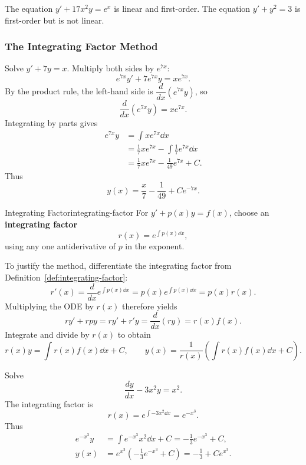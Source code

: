 \begin{example}
  The equation $y'+17x^2y=e^x$ is linear and first-order.
  The equation $y'+y^2=3$ is first-order but is not linear.
\end{example}

\subsubsection{The Integrating Factor Method}

\begin{example}
  Solve $y'+7y=x$. Multiply both sides by $e^{7x}$:
  \[
    e^{7x}y'+7e^{7x}y=xe^{7x}.
  \]
  By the product rule, the left-hand side is $\dfrac{d}{dx}(e^{7x}y)$, so
  \[
    \frac{d}{dx}(e^{7x}y)=xe^{7x}.
  \]
  Integrating by parts gives
  \begin{align*}
    e^{7x}y & = \int xe^{7x}\dd{x}                       \\
            & = \frac17 xe^{7x}-\int\frac17 e^{7x}\dd{x} \\
            & = \frac17 xe^{7x}-\frac1{49}e^{7x}+C.
  \end{align*}
  Thus
  \[
    y(x)=\frac{x}{7}-\frac1{49}+Ce^{-7x}.
  \]
\end{example}

\begin{definition}{Integrating Factor}{integrating-factor}
  For $y'+p(x)y=f(x)$, choose an \textbf{integrating factor}
  \[
    r(x)=e^{\int p(x)\dd{x}},
  \]
  using any one antiderivative of $p$ in the exponent.
\end{definition}

To justify the method, differentiate the integrating factor from Definition~\ref{def:integrating-factor}:
\[
  r'(x)=\frac{d}{dx}e^{\int p(x)\dd{x}}
  =p(x)e^{\int p(x)\dd{x}}=p(x)r(x).
\]
Multiplying the ODE by $r(x)$ therefore yields
\[
  ry'+rpy=ry'+r'y=\frac{d}{dx}(ry)=r(x)f(x).
\]
Integrate and divide by $r(x)$ to obtain
\[
  r(x)y=\int r(x)f(x)\dd{x}+C,
  \qquad
  y(x)=\frac{1}{r(x)}\left(\int r(x)f(x)\dd{x}+C\right).
\]

\begin{example}
  Solve
  \[
    \frac{dy}{dx}-3x^2y=x^2.
  \]
  The integrating factor is
  \[
    r(x)=e^{\int -3x^2\dd{x}}=e^{-x^3}.
  \]
  Thus
  \begin{align*}
    e^{-x^3}y & = \int e^{-x^3}x^2\dd{x}+C
    =-\frac13 e^{-x^3}+C,                                 \\
    y(x)      & = e^{x^3}\left(-\frac13 e^{-x^3}+C\right)
    =-\frac13+Ce^{x^3}.
  \end{align*}
\end{example}

